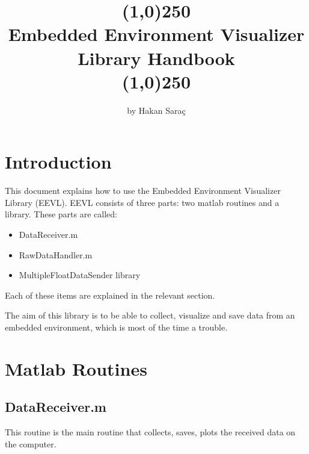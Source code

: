 \documentclass{article}
\author{by \hisfont Hakan Saraç}
\date{}
\begin{document}
\title{\line(1,0){250}\\\myfont Embedded Environment Visualizer Library Handbook \\\line(1,0){250}}
\maketitle
\newpage
\tableofcontents
\newpage


\section{Introduction}


This document explains how to use the Embedded Environment Visualizer Library (EEVL). EEVL consists of three parts: two matlab routines and a library. These parts are called:
\begin{itemize}
	\item DataReceiver.m
	\item RawDataHandler.m
	\item MultipleFloatDataSender library
\end{itemize}

Each of these items are explained in the relevant section.
\newline

The aim of this library is to be able to collect, visualize and save data from an embedded environment, which is most of the time a trouble. 



\section{Matlab Routines} 
\subsection{DataReceiver.m} 

This routine is the main routine that collects, saves, plots the received data on the computer. 
\end{document}
